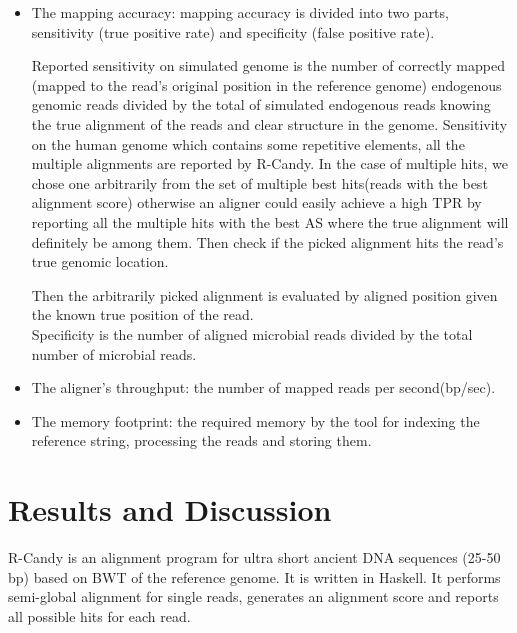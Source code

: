 \documentclass[11pt,a4paper]{report}
\begin{document}
\begin{itemize}

 \item The mapping accuracy: mapping accuracy is divided into two parts, 
 sensitivity (true positive rate) and specificity (false positive rate).

 Reported sensitivity on simulated genome is the number of correctly mapped
 (mapped to the read's original position in the reference genome) 
endogenous genomic reads divided by the total of simulated endogenous reads 
knowing the true alignment of the reads and clear structure in the genome.
Sensitivity on the human genome which contains some repetitive elements,
all the multiple alignments are reported by R-Candy.
In the case of multiple hits, we chose one arbitrarily from the set of 
multiple best hits(reads with the best alignment score) otherwise 
an aligner could easily achieve a high TPR by reporting all the multiple 
hits with the best AS where the true alignment will definitely be among them.
Then check if the picked alignment hits the read's true genomic location.

Then the arbitrarily picked alignment is evaluated 
by aligned position given the known true position of the read.\\


Specificity is the number of aligned  microbial reads 
divided by the total number of  microbial reads.

 \item The aligner's throughput: the number of mapped reads per second(bp/sec).

 \item The memory footprint: the required memory by the tool for indexing 
the reference string, processing the reads and storing them. 

\end{itemize}
 



\section{Results and Discussion} \label{Results and Discussion}

R-Candy is an alignment program for ultra short ancient DNA sequences 
(25-50 bp) based on BWT of the reference genome. It is written in Haskell. 
It performs semi-global alignment for single reads, 
generates an alignment score and reports all possible hits for each read.
\end{document}
